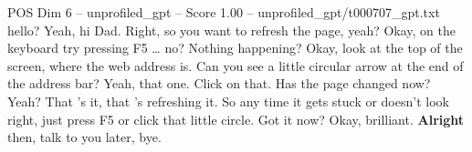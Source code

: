 \begin{textsample}{POS Dim 6 – unprofiled\_gpt – Score 1.00 – unprofiled\_gpt/t000707\_gpt.txt}  \label{ex:f6_pos_023}
hello?
Yeah, hi Dad.
Right, so you want to refresh the page, yeah?
Okay, on the keyboard try pressing F5 … no?
Nothing happening?
Okay, look at the top of the screen, where the web address is.
Can you see a little circular arrow at the end of the address bar?
Yeah, that one.
Click on that.
Has the page changed now?
Yeah?
That ’s it, that ’s refreshing it.
So any time it gets stuck or doesn't look right, just press F5 or click that little circle.
Got it now?
Okay, brilliant. \textbf{Alright} then, talk to you later, bye.

\end{textsample}
